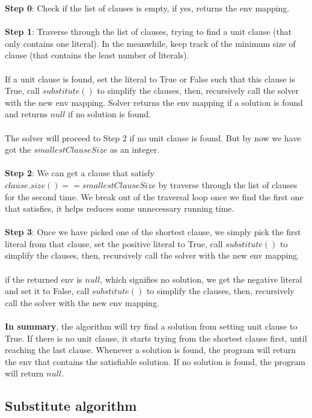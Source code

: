 \documentclass[a4paper,12pt]{article}
\begin{document}
\begin{multicols}{2}
\textbf{Step 0}: Check if the list of clauses is empty, if yes, returns the env mapping.\\
\\
\textbf{Step 1}: Traverse through the list of clauses,
trying to find a unit clause (that only contains one literal). 
In the meanwhile, keep track of the minimum size of clause 
(that contains the least number of literals). \\
\\
If a unit clause is found, set the literal to True or False such that this clause is True, 
call $substitute()$ to simplify the clauses, then, recursively call the solver with the new env mapping.
Solver returns the env mapping if a solution is found and returns $null$ if no solution is found.\\
\\ 
The solver will proceed to Step 2 if no unit clause is found. 
But by now we have got the $smallestClauseSize$ as an integer. \\
\\
\textbf{Step 2}: We can get a clause that satisfy $clause.size() == smallestClauseSize$
by traverse through the list of clauses for the second time. 
We break out of the traversal loop once we find the first one that satisfies, 
it helps reduces some unnecessary running time.\\
\\
\textbf{Step 3}: Once we have picked one of the shortest clause, 
we simply pick the first literal from that clause, set the positive literal to True,
call $substitute()$ to simplify the clauses, then, 
recursively call the solver with the new env mapping.\\
\\
if the returned env is $null$, which signifies no solution, we get the negative literal
and set it to False, call $substitute()$ to simplify the clauses, then, 
recursively call the solver with the new env mapping.\\
\\
\textbf{In summary}, the algorithm will try find a solution from setting unit clause to True. 
If there is no unit clause, it starts trying from the shortest clause first, until reaching the last clause.
Whenever a solution is found, the program will return the env that contains the satisfiable solution.
If no solution is found, the program will return $null$.

\subsection*{Substitute algorithm}


\end{multicols}
\end{document}
